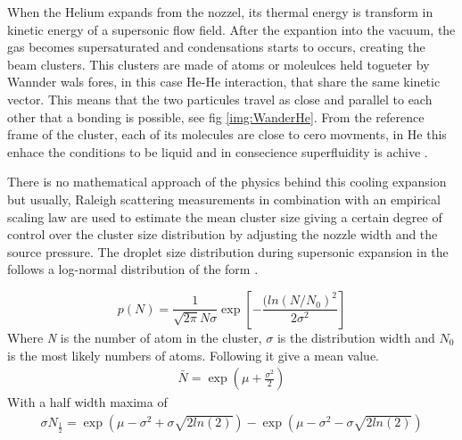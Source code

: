 When the Helium expands from the nozzel, its thermal energy is transform in kinetic energy of a supersonic flow field. After the expantion into the vacuum, the gas becomes supersaturated and condensations starts to occurs, creating the beam clusters. This clusters are made of atoms or moleulces held togueter by Wannder wals fores, in this case He-He interaction, that share the same kinetic vector. This means that the two particules travel as close and parallel to each other that a bonding is possible, see fig \ref{img:WanderHe}. From the reference frame of the cluster, each of its molecules are close to cero movments, in He this enhace the conditions to be liquid and in consecience superfluidity is achive  \cite{hagena_cluster_1972}.
 

There is no mathematical approach of the physics behind this cooling expansion but usually, Raleigh scattering measurements in combination with an empirical scaling law \cite{hagena_cluster_1972} are used to estimate the mean cluster size giving a certain degree of control over the cluster size distribution by adjusting the nozzle width and the source pressure. The droplet size distribution during supersonic expansion in the follows a log-normal distribution of the form \cite{harms_density_1998}.

\begin{equation}
p(N) = \frac{1}{\sqrt{2\pi}N \sigma} \exp  \left[- \frac{(ln(N/N_{0})^2}{2\sigma^2} \right]
\end{equation}
Where \textit{N} is the number of atom in the cluster, $\sigma$ is the distribution width and \textit{$N_{0}$} is the most likely numbers of atoms. Following it give a mean value.
\begin{align}
\bar N = \exp  \left(\mu+\frac{\sigma^2}{2} \right)
\end{align}
With a half width maxima of \cite{harms_density_1998}
\begin{align}
\sigma N_{\frac{1}{2}} = \exp \left( \mu - \sigma ^2 + \sigma \sqrt{2 ln(2)} \right) - \exp \left(  \mu - \sigma ^2 - \sigma \sqrt{2 ln(2)}  \right)
\end{align}

